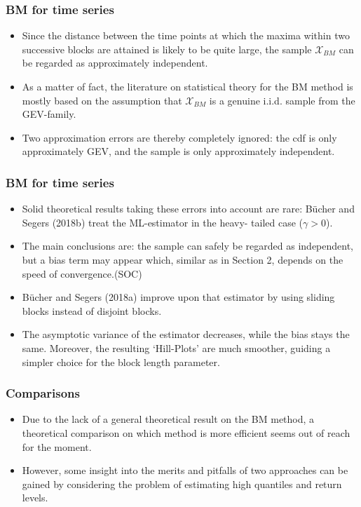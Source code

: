 \documentclass{beamer}
\begin{document}
\begin{frame}
    \frametitle{BM for time series}
\begin{itemize}
    \item Since the distance between the time points at which the maxima within two successive blocks
    are attained is likely to be quite large, the sample $\mathcal{X}_{BM}$ can be regarded as approximately independent.
    \item As a matter of fact, the literature on statistical theory for the BM method is mostly
    based on the assumption that $\mathcal{X}_{BM}$ is a genuine i.i.d. sample from the GEV-family.
    \item Two approximation errors are thereby completely ignored: the cdf is only approximately
    GEV, and the sample is only approximately independent.
\end{itemize}
    

\end{frame}

\begin{frame}
    \frametitle{BM for time series}

\begin{itemize}
    \item Solid theoretical results taking these
    errors into account are rare: Bücher and Segers (2018b) treat the ML-estimator in the heavy-
    tailed case ($\gamma>0$).
    \item The main conclusions are: the sample can safely be regarded as independent,
    but a bias term may appear which, similar as in Section 2, depends on the speed of convergence.(SOC)
    \item Bücher and Segers (2018a) improve upon that estimator by using sliding blocks instead
    of disjoint blocks. 
    \item The asymptotic variance of the estimator decreases, while the bias stays the
    same. Moreover, the resulting ‘Hill-Plots’ are much smoother, guiding a simpler choice for the
    block length parameter.
\end{itemize}

\end{frame}


\begin{frame}
    \frametitle{Comparisons}

    \begin{itemize}
        \item Due to the lack of a general theoretical result on the BM method, a theoretical comparison on 
        which method is more efficient seems out of reach for the moment.
        \item However, some insight into the merits and pitfalls of two approaches can be
        gained by considering the problem of estimating high quantiles and return levels.
    \end{itemize}

\end{frame}
\end{document}
